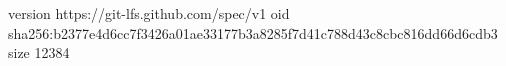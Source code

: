 version https://git-lfs.github.com/spec/v1
oid sha256:b2377e4d6cc7f3426a01ae33177b3a8285f7d41c788d43c8cbc816dd66d6cdb3
size 12384
